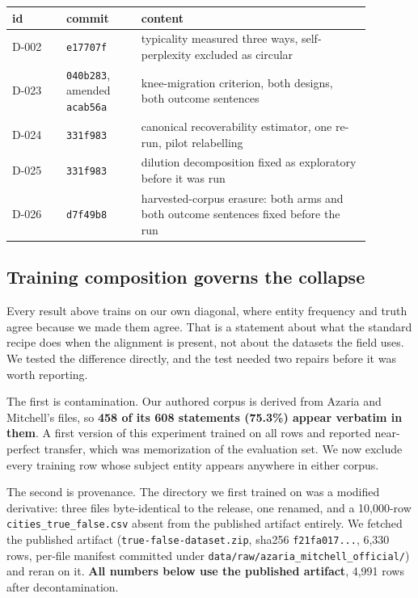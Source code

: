 \documentclass[10pt]{article}
\begin{document}
\begin{table}[H]
\centering
\small
\begin{tabular}{>{\raggedright\arraybackslash}p{0.133\linewidth} >{\raggedright\arraybackslash}p{0.188\linewidth} >{\raggedright\arraybackslash}p{0.559\linewidth}}
\toprule
\textbf{id} & \textbf{commit} & \textbf{content} \\
\midrule
D-002 & \texttt{e17707f} & typicality measured three ways, self-perplexity excluded as circular \\
D-023 & \texttt{040b283}, amended \texttt{acab56a} & knee-migration criterion, both designs, both outcome sentences \\
D-024 & \texttt{331f983} & canonical recoverability estimator, one re-run, pilot relabelling \\
D-025 & \texttt{331f983} & dilution decomposition fixed as exploratory before it was run \\
D-026 & \texttt{d7f49b8} & harvested-corpus erasure: both arms and both outcome sentences fixed before the run \\
\bottomrule
\end{tabular}
\end{table}

\subsection{Training composition governs the collapse}

Every result above trains on our own diagonal, where entity frequency and truth agree because we made them agree. That is a statement about what the standard recipe does when the alignment is present, not about the datasets the field uses. We tested the difference directly, and the test needed two repairs before it was worth reporting.

The first is contamination. Our authored corpus is derived from Azaria and Mitchell's files, so \textbf{458 of its 608 statements (75.3\%) appear verbatim in them}. A first version of this experiment trained on all rows and reported near-perfect transfer, which was memorization of the evaluation set. We now exclude every training row whose subject entity appears anywhere in either corpus.

The second is provenance. The directory we first trained on was a modified derivative: three files byte-identical to the release, one renamed, and a 10,000-row \texttt{cities\_true\_false.csv} absent from the published artifact entirely. We fetched the published artifact (\texttt{true-false-dataset.zip}, sha256 \texttt{f21fa017...}, 6,330 rows, per-file manifest committed under \texttt{data/raw/azaria\_mitchell\_official/}) and reran on it. \textbf{All numbers below use the published artifact}, 4,991 rows after decontamination.
\end{document}
